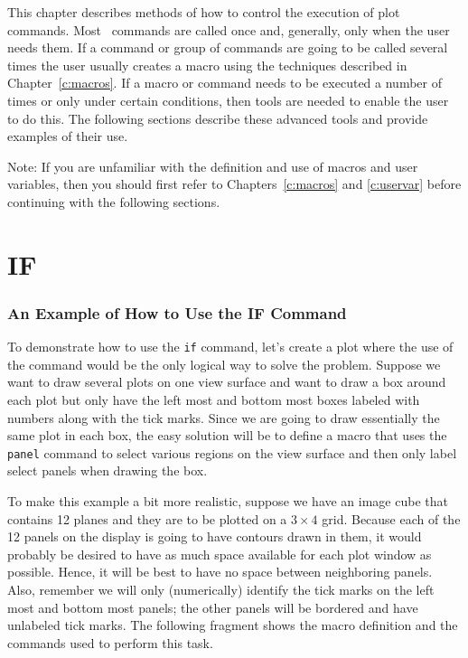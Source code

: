 %
%

This chapter describes methods of how to control the execution of plot
commands.
Most \wip\ commands are called once and, generally, only when the user
needs them.
If a command or group of commands are going to be called several times
the user usually creates a macro using the techniques
described in Chapter~\ref{c:macros}.
If a macro or command needs to be executed a number of times or only
under certain conditions,
then tools are needed to enable the user to do this.
The following sections describe these advanced tools and provide
examples of their use.

{\sc Note}:
If you are unfamiliar with the definition and use of macros and user
variables,
then you should first refer to
Chapters~\ref{c:macros} and \ref{c:uservar}
before continuing with the following sections.

\section{IF}

\subsubsection*         {An Example of How to Use the IF Command}

To demonstrate how to use the
{\tt if}
command,
let's create a plot
where the use of the command would be the only logical way to solve the problem.
Suppose we want to draw several plots on one
view surface and want to draw a
box around each plot but only have the left most and
bottom most boxes labeled with numbers along with the tick marks.
Since we are going to draw essentially the same plot in each box,
the easy solution will be to define a macro that
uses the {\tt panel}%
 command
to select various regions on the view surface
and then only label select panels when drawing the box.

To make this example a bit more realistic,
suppose we have an image cube that contains 12 planes and they are to be
plotted on a $3\times4$ grid.
Because each of the 12 panels on the display is going to have
contours drawn in them,
it would probably be desired to have as much space available for
each plot window as possible.
Hence, it will be best to have no space between neighboring panels.
Also, remember we will
only (numerically) identify the tick marks on the left most and bottom
most panels; the other panels will be bordered and have unlabeled
tick marks.
The following fragment shows the macro definition and the commands
used to perform this task.

